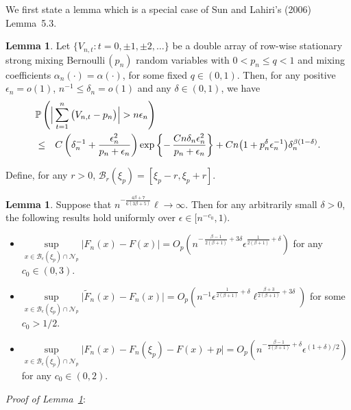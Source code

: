 \documentclass[a4paper, 12pt]{article}
\theoremstyle{plain}
\theoremstyle{definition}
\newcommand{\prob}{{\Bbb P}}
\newtheorem{lem}[thm]{Lemma}
\begin{document}
We first state a lemma which is a special case of Sun and Lahiri's (2006)
Lemma~5.3.
\begin{lem}
\label{lem:ineq}
Let $\big\{V_{n,t}:t=0,\pm 1,\pm 2,\ldots\big\}$ be a double array of
row-wise stationary strong mixing Bernoulli$\,(p_n)$ random variables with
$0<p_n\le q<1$ and mixing
coefficients $\alpha_n(\cdot)=\alpha(\cdot)$, for some fixed $q\in(0,1)$.
Then, for any positive
$\epsilon_n=o(1)$, $n^{-1}\le\delta_n=o(1)$ and any $\delta\in(0,1)$, we have
\begin{eqnarray*}
\lefteqn{\prob\left(\Big|
\sum_{t=1}^n\big(V_{n,t}-p_n\big)\Big|>n\epsilon_n\right)}\nonumber\\
&\le& C
\left(\delta_n^{-1}+\dfrac{\epsilon_n^2}{p_n+\epsilon_n}\right)
\exp\left\{-\,\dfrac{Cn\delta_n\epsilon_n^2}{p_n+\epsilon_n}\right\}
+Cn\big(1+p_n^{\delta}\epsilon_n^{-1}\big)\delta_n^{\beta(1-\delta)}.
\end{eqnarray*}
\end{lem}
Define, for any $r>0$, $\mathscr{B}_r(\xi_p)=[\xi_p-r,\xi_p+r]$.
\begin{lem}
\label{lem:empcdf}
Suppose that $n^{-\frac{4\beta+7}{6(3\beta+5)}}\ell\rightarrow\infty$. Then
for any arbitrarily small $\delta>0$,
the following results hold uniformly over $\epsilon\in\big[n^{-c_0},1\big)$.
\begin{itemize}
\item[(i)]
$\displaystyle\underset{x\in\mathscr{B}_\epsilon(\xi_p)\cap\mathscr{N}_p}\sup
\big|F_n(x)-F(x)\big|=O_p\left(n^{-\,\frac{\beta-1}{2(\beta+1)}+3\delta}
\epsilon^{\frac{1}{2(\beta+1)}+\delta}\right)$
for any $c_0\in(0,3)$.

\item[(ii)]
$\displaystyle\underset{x\in\mathscr{B}_\epsilon(\xi_p)\cap\mathscr{N}_p}\sup
\big|\tilde{F}_n(x)-F_n(x)\big|=O_p\left(
n^{-1}\epsilon^{\frac{1}{2(\beta+1)}+\delta}
\ell^{\frac{\beta+3}{2(\beta+1)}+3\delta}\right)$
for some $c_0>1/2$.

\item[(iii)]
$\displaystyle\underset{x\in\mathscr{B}_\epsilon(\xi_p)\cap\mathscr{N}_p}\sup
\big|{F}_n(x)-F_n(\xi_p)-F(x)+p\big|=O_p\left(n^{-\frac{\beta-1}{2(\beta+1)}+\delta}\epsilon^{(1+\delta)/2}\right)$
for any $c_0\in(0,2)$.
\end{itemize}
\end{lem}
{\it Proof of Lemma~\ref{lem:empcdf}\/}:
\end{document}

